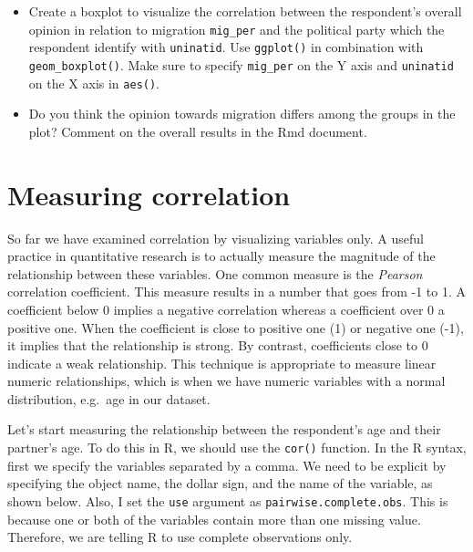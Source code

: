 \documentclass[
]{book}
\newenvironment{Shaded}{\begin{snugshade}}{\end{snugshade}}
\newcommand{\AttributeTok}[1]{\textcolor[rgb]{0.13,0.29,0.53}{#1}}
\newcommand{\FunctionTok}[1]{\textcolor[rgb]{0.13,0.29,0.53}{\textbf{#1}}}
\newcommand{\NormalTok}[1]{#1}
\newcommand{\SpecialCharTok}[1]{\textcolor[rgb]{0.81,0.36,0.00}{\textbf{#1}}}
\newcommand{\StringTok}[1]{\textcolor[rgb]{0.31,0.60,0.02}{#1}}
\providecommand{\tightlist}{%
  \setlength{\itemsep}{0pt}\setlength{\parskip}{0pt}}
\begin{document}
\begin{itemize}
\tightlist
\item
  Create a boxplot to visualize the correlation between the respondent's overall opinion in relation to migration \texttt{mig\_per} and the political party which the respondent identify with \texttt{uninatid}. Use \texttt{ggplot()} in combination with \texttt{geom\_boxplot()}. Make sure to specify \texttt{mig\_per} on the Y axis and \texttt{uninatid} on the X axis in \texttt{aes()}.
\item
  Do you think the opinion towards migration differs among the groups in the plot? Comment on the overall results in the Rmd document.
\end{itemize}

\hypertarget{measuring-correlation}{%
\section{Measuring correlation}\label{measuring-correlation}}

So far we have examined correlation by visualizing variables only. A useful practice in quantitative research is to actually measure the magnitude of the relationship between these variables. One common measure is the \emph{Pearson} correlation coefficient. This measure results in a number that goes from -1 to 1. A coefficient below 0 implies a negative correlation whereas a coefficient over 0 a positive one. When the coefficient is close to positive one (1) or negative one (-1), it implies that the relationship is strong. By contrast, coefficients close to 0 indicate a weak relationship. This technique is appropriate to measure linear numeric relationships, which is when we have numeric variables with a normal distribution, e.g.~age in our dataset.

Let's start measuring the relationship between the respondent's age and their partner's age. To do this in R, we should use the \texttt{cor()} function. In the R syntax, first we specify the variables separated by a comma. We need to be explicit by specifying the object name, the dollar sign, and the name of the variable, as shown below. Also, I set the \texttt{use} argument as \texttt{\textquotesingle{}pairwise.complete.obs\textquotesingle{}}. This is because one or both of the variables contain more than one missing value. Therefore, we are telling R to use complete observations only.

\begin{Shaded}
\end{Shaded}
\end{document}

